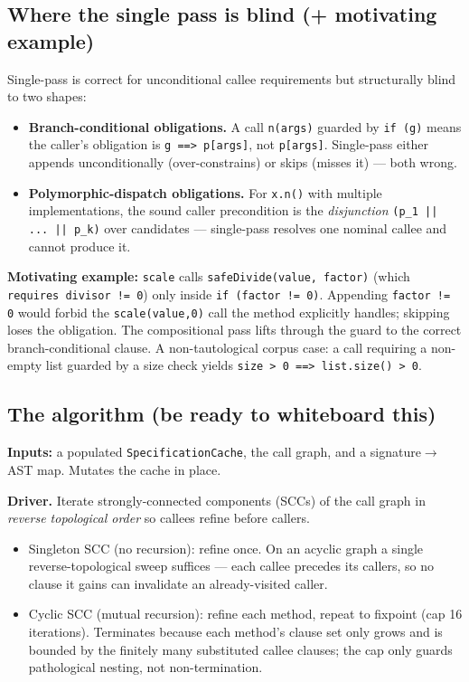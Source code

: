 \documentclass[11pt]{article}
\begin{document}
\subsection{Where the single pass is blind (+ motivating example)}

Single-pass is correct for unconditional callee requirements but structurally
blind to two shapes:
\begin{itemize}[leftmargin=1.4em,itemsep=0.05em]
  \item \textbf{Branch-conditional obligations.} A call \texttt{n(args)} guarded
        by \texttt{if (g)} means the caller's obligation is
        \texttt{g ==> p[args]}, not \texttt{p[args]}. Single-pass either
        appends unconditionally (over-constrains) or skips (misses it) --- both
        wrong.
  \item \textbf{Polymorphic-dispatch obligations.} For \texttt{x.n()} with
        multiple implementations, the sound caller precondition is the
        \emph{disjunction} \texttt{(p\_1 || ... || p\_k)} over candidates ---
        single-pass resolves one nominal callee and cannot produce it.
\end{itemize}
\textbf{Motivating example:} \texttt{scale} calls \texttt{safeDivide(value,
factor)} (which \texttt{requires divisor != 0}) only inside \texttt{if (factor
!= 0)}. Appending \texttt{factor != 0} would forbid the \texttt{scale(value,0)}
call the method explicitly handles; skipping loses the obligation. The
compositional pass lifts through the guard to the correct branch-conditional
clause. A non-tautological corpus case: a call requiring a non-empty list
guarded by a size check yields \texttt{size > 0 ==> list.size() > 0}.

\subsection{The algorithm (be ready to whiteboard this)}

\textbf{Inputs:} a populated \texttt{SpecificationCache}, the call graph, and
a signature$\to$AST map. Mutates the cache in place.

\textbf{Driver.} Iterate strongly-connected components (SCCs) of the call graph
in \emph{reverse topological order} so callees refine before callers.
\begin{itemize}[leftmargin=1.4em,itemsep=0.05em]
  \item Singleton SCC (no recursion): refine once. On an acyclic graph a single
        reverse-topological sweep suffices --- each callee precedes its
        callers, so no clause it gains can invalidate an already-visited caller.
  \item Cyclic SCC (mutual recursion): refine each method, repeat to fixpoint
        (cap 16 iterations). Terminates because each method's clause set only
        grows and is bounded by the finitely many substituted callee clauses;
        the cap only guards pathological nesting, not non-termination.
\end{itemize}
\end{document}
